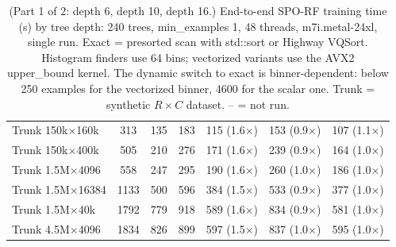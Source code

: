 \begin{table}[p]
\begin{tabular}{l|ccc|ccc}
        Trunk 150k$\times$160k & 313 & 135 & 183 & 115 (1.6$\times$) & 153 (0.9$\times$) & 107 (1.1$\times$) \\
        Trunk 150k$\times$400k & 505 & 210 & 276 & 171 (1.6$\times$) & 239 (0.9$\times$) & 164 (1.0$\times$) \\
        Trunk 1.5M$\times$4096 & 558 & 247 & 295 & 190 (1.6$\times$) & 260 (1.0$\times$) & 186 (1.0$\times$) \\
        Trunk 1.5M$\times$16384 & 1133 & 500 & 596 & 384 (1.5$\times$) & 533 (0.9$\times$) & 377 (1.0$\times$) \\
        Trunk 1.5M$\times$40k & 1792 & 779 & 918 & 589 (1.6$\times$) & 834 (0.9$\times$) & 581 (1.0$\times$) \\
        Trunk 4.5M$\times$4096 & 1834 & 826 & 899 & 597 (1.5$\times$) & 837 (1.0$\times$) & 595 (1.0$\times$) \\
        \hline
    \end{tabular}
    \caption{ (Part 1 of 2: depth 6, depth 10, depth 16.) End-to-end SPO-RF training time (s) by tree depth: 240 trees, min\_examples 1, 48 threads, m7i.metal-24xl, single run. Exact = presorted scan with std::sort or Highway VQSort. Histogram finders use 64 bins; vectorized variants use the AVX2 upper\_bound kernel. The dynamic switch to exact is binner-dependent: below 250 examples for the vectorized binner, 4600 for the scalar one. Trunk = synthetic $R\times C$ dataset. -- = not run.}
    \label{tab:overall}
\end{table}

